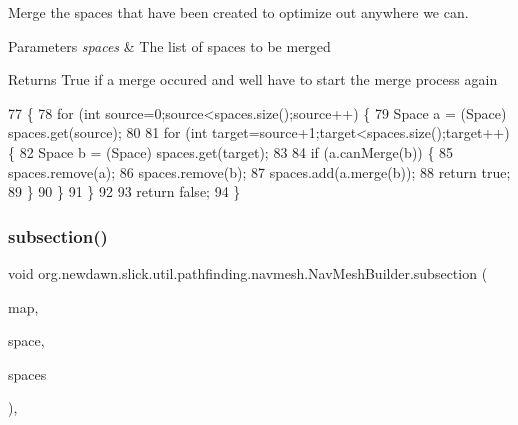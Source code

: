 Merge the spaces that have been created to optimize out anywhere we can.


\begin{DoxyParams}{Parameters}
{\em spaces} & The list of spaces to be merged \\
\hline
\end{DoxyParams}
\begin{DoxyReturn}{Returns}
True if a merge occured and we\textquotesingle{}ll have to start the merge process again 
\end{DoxyReturn}

\begin{DoxyCode}
77                                                   \{
78         \textcolor{keywordflow}{for} (\textcolor{keywordtype}{int} source=0;source<spaces.size();source++) \{
79             Space a = (Space) spaces.get(source);
80             
81             \textcolor{keywordflow}{for} (\textcolor{keywordtype}{int} target=source+1;target<spaces.size();target++) \{
82                 Space b = (Space) spaces.get(target);
83                 
84                 \textcolor{keywordflow}{if} (a.canMerge(b)) \{
85                     spaces.remove(a);
86                     spaces.remove(b);
87                     spaces.add(a.merge(b));
88                     \textcolor{keywordflow}{return} \textcolor{keyword}{true};
89                 \}
90             \}
91         \}
92         
93         \textcolor{keywordflow}{return} \textcolor{keyword}{false};
94     \}
\end{DoxyCode}
\mbox{\label{classorg_1_1newdawn_1_1slick_1_1util_1_1pathfinding_1_1navmesh_1_1_nav_mesh_builder_a37b630686bc4b90ec044f5e72bfd252b}} 
\subsubsection{\texorpdfstring{subsection()}{subsection()}}
{\footnotesize\ttfamily void org.\+newdawn.\+slick.\+util.\+pathfinding.\+navmesh.\+Nav\+Mesh\+Builder.\+subsection (\begin{DoxyParamCaption}\item[{\mbox{\hyperlink{interfaceorg_1_1newdawn_1_1slick_1_1util_1_1pathfinding_1_1_tile_based_map}{Tile\+Based\+Map}}}]{map,  }\item[{\mbox{\hyperlink{classorg_1_1newdawn_1_1slick_1_1util_1_1pathfinding_1_1navmesh_1_1_space}{Space}}}]{space,  }\item[{Array\+List}]{spaces }\end{DoxyParamCaption})\hspace{0.3cm}{\ttfamily [inline]}, {\ttfamily [private]}}

